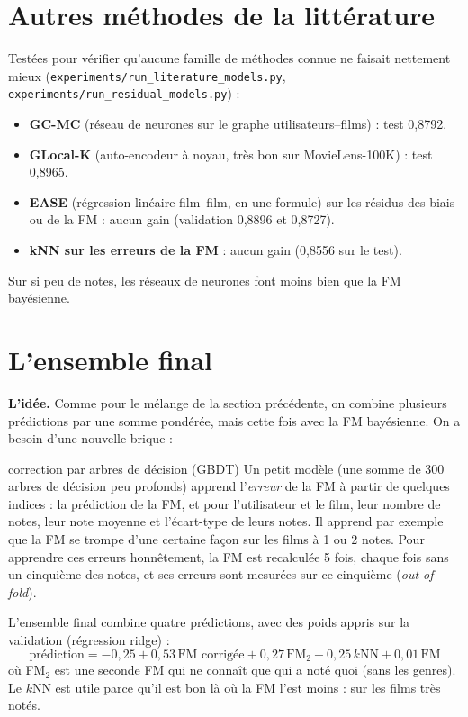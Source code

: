 \documentclass[11pt,a4paper]{article}
\begin{document}
\section{Autres méthodes de la littérature}

Testées pour vérifier qu'aucune famille de méthodes connue ne faisait nettement mieux
(\texttt{experiments/run\_literature\_models.py}, \texttt{experiments/run\_residual\_models.py}) :
\begin{itemize}
  \item \textbf{GC-MC} (réseau de neurones sur le graphe utilisateurs--films) : test 0,8792.
  \item \textbf{GLocal-K} (auto-encodeur à noyau, très bon sur MovieLens-100K) : test 0,8965.
  \item \textbf{EASE} (régression linéaire film--film, en une formule) sur les résidus des
        biais ou de la FM : aucun gain (validation 0,8896 et 0,8727).
  \item \textbf{kNN sur les erreurs de la FM} : aucun gain (0,8556 sur le test).
\end{itemize}
Sur si peu de notes, les réseaux de neurones font moins bien que la FM bayésienne.

\section{L'ensemble final}\label{sec:stack}

\textbf{L'idée.} Comme pour le mélange de la section précédente, on combine plusieurs
prédictions par une somme pondérée, mais cette fois avec la FM bayésienne. On a besoin
d'une nouvelle brique :

\begin{definition}{correction par arbres de décision (GBDT)}
Un petit modèle (une somme de 300 arbres de décision peu profonds) apprend l'\emph{erreur}
de la FM à partir de quelques indices : la prédiction de la FM, et pour l'utilisateur et le
film, leur nombre de notes, leur note moyenne et l'écart-type de leurs notes. Il apprend
par exemple que la FM se trompe d'une certaine façon sur les films à 1 ou 2 notes.
Pour apprendre ces erreurs honnêtement, la FM est recalculée 5 fois, chaque fois sans un
cinquième des notes, et ses erreurs sont mesurées sur ce cinquième (\emph{out-of-fold}).
\end{definition}

L'ensemble final combine quatre prédictions, avec des poids appris sur la validation
(régression ridge) :
\[
  \text{prédiction} = -0{,}25 + 0{,}53\,\text{FM corrigée} + 0{,}27\,\text{FM}_2
  + 0{,}25\,k\text{NN} + 0{,}01\,\text{FM}
\]
où FM$_2$ est une seconde FM qui ne connaît que \og qui a noté quoi \fg{} (sans les genres).
Le $k$NN est utile parce qu'il est bon là où la FM l'est moins : sur les films très notés.
\end{document}
